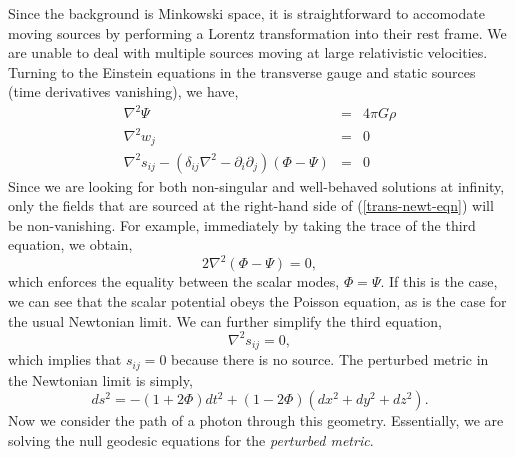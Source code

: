 Since the background is Minkowski space, it is straightforward to accomodate moving sources by performing a Lorentz transformation into their rest frame. We are unable to deal with multiple sources moving at large relativistic velocities. Turning to the Einstein equations in the transverse gauge and static sources (time derivatives vanishing), we have, 
\begin{eqnarray}\label{trans-newt-eqn}
    \nabla^2\Psi &=& 4\pi G\rho\nonumber\\
    \nabla^2w_j&=&0\\
    \nabla^2s_{ij} - (\delta_{ij}\nabla^2 - \partial_i\partial_j)(\Phi-\Psi)&=&0\nonumber
\end{eqnarray}
Since we are looking for both non-singular and well-behaved solutions at infinity, only the fields that are sourced at the right-hand side of (\ref{trans-newt-eqn}) will be non-vanishing. For example, immediately by taking the trace of the third equation, we obtain, 
\begin{equation}
    2\nabla^2(\Phi - \Psi)=0,
\end{equation}
which enforces the equality between the scalar modes, $\Phi = \Psi$. If this is the case, we can see that the scalar potential obeys the Poisson equation, as is the case for the usual Newtonian limit. We can further simplify the third equation, 
\begin{equation}
    \nabla^2s_{ij}=0,
\end{equation}
which implies that $s_{ij}=0$ because there is no source. The perturbed metric in the Newtonian limit is simply, 
\begin{equation}
    ds^2 = -(1+2\Phi)dt^2 + (1-2\Phi)(dx^2 + dy^2+dz^2).
\end{equation}
Now we consider the path of a photon through this geometry. Essentially, we are solving the null geodesic equations for the \textit{perturbed metric}. 